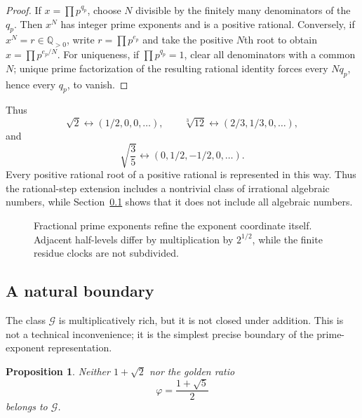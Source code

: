 \documentclass[11pt,a4paper]{article}
\theoremstyle{clockplain}
\newtheorem{proposition}{Proposition}
\theoremstyle{definition}
\theoremstyle{remark}
\newcommand{\Q}{\mathbb Q}
\newcommand{\G}{\mathcal G}
\begin{document}
\begin{proof}
If $x=\prod p^{q_p}$, choose $N$ divisible by the finitely many denominators of the $q_p$. Then $x^N$ has integer prime exponents and is a positive rational. Conversely, if $x^N=r\in\Q_{>0}$, write $r=\prod p^{e_p}$ and take the positive $N$th root to obtain $x=\prod p^{e_p/N}$. For uniqueness, if $\prod p^{q_p}=1$, clear all denominators with a common $N$; unique prime factorization of the resulting rational identity forces every $Nq_p$, hence every $q_p$, to vanish.
\end{proof}

Thus
\[
\sqrt2\longleftrightarrow(1/2,0,0,\ldots),
\qquad
\sqrt[3]{12}\longleftrightarrow(2/3,1/3,0,\ldots),
\]
and
\[
\sqrt{\frac35}\longleftrightarrow(0,1/2,-1/2,0,\ldots).
\]
Every positive rational root of a positive rational is represented in this way. Thus the rational-step extension includes a nontrivial class of irrational algebraic numbers, while Section~\ref{sec:natural-boundary} shows that it does not include all algebraic numbers.

\begin{figure}[ht]
\centering
{}
\caption{Fractional prime exponents refine the exponent coordinate itself. Adjacent half-levels differ by multiplication by $2^{1/2}$, while the finite residue clocks are not subdivided.}
\label{fig:fractional}
\end{figure}

\subsection{A natural boundary}
\label{sec:natural-boundary}

The class $\G$ is multiplicatively rich, but it is not closed under addition. This is not a technical inconvenience; it is the simplest precise boundary of the prime-exponent representation.

\begin{proposition}
Neither $1+\sqrt2$ nor the golden ratio
\[
\varphi=\frac{1+\sqrt5}{2}
\]
belongs to $\G$.
\end{proposition}
\end{document}
